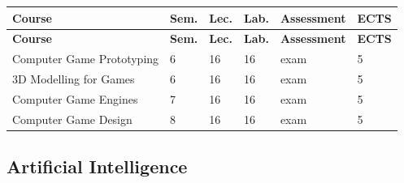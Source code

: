 \documentclass[12pt,a4paper]{article}
\newcommand{\thdrule}{\noalign{\global\setlength{\extrarowheight}{0pt}}}
\newcommand{\thdend}{\noalign{\global\setlength{\extrarowheight}{4pt}}}
\begin{document}
{\scriptsize
\begin{longtable}{m{6.5cm}m{0.7cm}m{1cm}m{1cm}m{1.7cm}m{0.7cm}}
\thdrule\toprule
\rowcolor{pjatkRed}
{\color{white}\footnotesize\textbf{\vphantom{Ag}Course}} & {\color{white}\footnotesize\textbf{\vphantom{Ag}Sem.}} & {\color{white}\footnotesize\textbf{\vphantom{Ag}Lec.}} & {\color{white}\footnotesize\textbf{\vphantom{Ag}Lab.}} & {\color{white}\footnotesize\textbf{\vphantom{Ag}Assessment}} & {\color{white}\footnotesize\textbf{\vphantom{Ag}ECTS}} \\
\midrule\thdend
\endfirsthead
\thdrule\toprule
\rowcolor{pjatkRed}
{\color{white}\footnotesize\textbf{\vphantom{Ag}Course}} & {\color{white}\footnotesize\textbf{\vphantom{Ag}Sem.}} & {\color{white}\footnotesize\textbf{\vphantom{Ag}Lec.}} & {\color{white}\footnotesize\textbf{\vphantom{Ag}Lab.}} & {\color{white}\footnotesize\textbf{\vphantom{Ag}Assessment}} & {\color{white}\footnotesize\textbf{\vphantom{Ag}ECTS}} \\
\midrule\thdend
\endhead
\rowcolor{tableRowLight} Computer Game Prototyping & 6 & 16 & 16 & {\scriptsize exam} & 5 \\
\rowcolor{tableRowAlt} 3D Modelling for Games & 6 & 16 & 16 & {\scriptsize exam} & 5 \\
\rowcolor{tableRowLight} Computer Game Engines & 7 & 16 & 16 & {\scriptsize exam} & 5 \\
\rowcolor{tableRowAlt} Computer Game Design & 8 & 16 & 16 & {\scriptsize exam} & 5 \\
\bottomrule
\end{longtable}}

\subsection*{Artificial Intelligence}
\end{document}
